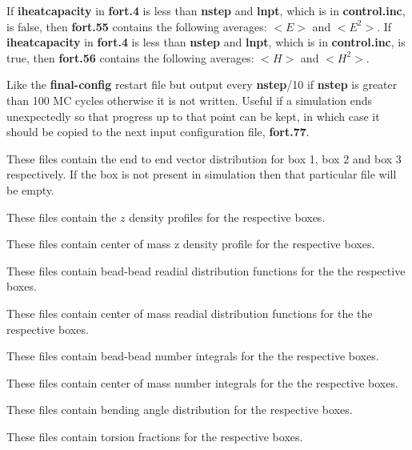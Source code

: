 \documentclass[12pt,letterpaper]{article}
\begin{document}
{{{{{{
If {\textbf{iheatcapacity}} in {\bf fort.4} is less than {\textbf{nstep}} and {\textbf{lnpt}}, which is in {\textbf{control.inc}}, 
is false, then {\textbf{fort.55}} contains the following averages: $<E>$ and $<E^2>$.
If {\textbf{iheatcapacity}} in {\bf fort.4} is less than {\textbf{nstep}} and {\textbf{lnpt}}, which is in {\textbf{control.inc}}, 
is true, then {\textbf{fort.56}} contains the following averages: $<H>$ and $<H^2>$.

Like the {\bf final-config} restart file but output every {{\bf{nstep}}/10}
if {\bf{nstep}} is greater than 100 MC cycles otherwise it is not
written. Useful if a simulation ends unexpectedly so that
progress up to that point can be kept, in which case it should be
copied to the next input configuration file, {\bf fort.77}.

 These files contain the end to
end vector distribution for box 1, box 2 and box 3 respectively. If the box is not present
in simulation then that particular file will be empty.

 These files contain the $z$ density profiles 
for the respective boxes.

 These files contain
center of mass z density profile for the respective boxes.

 These files contain
bead-bead readial distribution functions for the the respective boxes.

 These files contain
center of mass readial distribution functions for the the respective boxes.

 These files contain
bead-bead number integrals for the the respective boxes.

 These files contain
center of mass number integrals for the the respective boxes.

 These files contain bending angle distribution
for the respective boxes.

 These files contain torsion fractions
for the respective boxes.

}}}}}}
\end{document}
